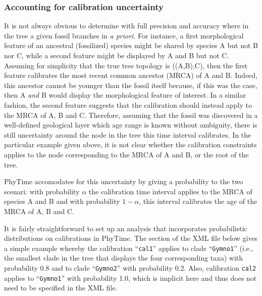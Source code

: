 \documentclass[a4paper,12pt]{article}
\newcommand{\x}[1]{\texttt{#1}}
\begin{document}
\subsubsection{Accounting for calibration uncertainty}

It is not always obvious to determine with full precision and accuracy where in the tree a given
fossil branches in {\em a priori}. For instance, a first morphological feature of an ancestral (fossilized) species
might be shared by species A but not B nor C, while a second feature might be displayed by A and B but
not C. Assuming for simplicity that the true tree topology is ((A,B),C), then the first feature calibrates the most recent common ancestor (MRCA) of A and
B. Indeed, this ancestor cannot be younger than the fossil itself because, if this was  the case, then
A {\em and} B would display the morphological feature of interest. In a similar fashion, the second
feature suggests that the calibration should instead apply to the MRCA of A, B and C. Therefore, assuming  that the fossil was discovered in a
well-defined geological layer which age range is known without ambiguity, there is still uncertainty
around the node in the tree this time interval calibrates. In the particular example given above, it
is not clear whether the calibration constraints applies to the node corresponding to the MRCA of A
and B, or the root of the tree.

PhyTime accomodates for this uncertainty by giving a
probability to the two scenari: with probability $\alpha$ the calibration time interval applies to
the MRCA of species A and B and with probability $1-\alpha$, this interval calibrates the age of the
MRCA of A, B and C. 

It is fairly straightforward to set up an analysis that incorporates probabilistic distributions on
calibrations in PhyTime. The section of the XML file below gives a simple example whereby the
calibration  ``\x{cal1}'' applies to clade ``\x{Gymno1}'' (i.e., the smallest clade in the tree that
displays the four corresponding taxa) with probability 0.8 and to clade ``\x{Gymno2}''  with probability 0.2.
Also, calibration \x{cal2} applies to ``\x{Gymno1}'' with probability 1.0, which is implicit here and
thus does not need to be specified in the XML file.
\end{document}
